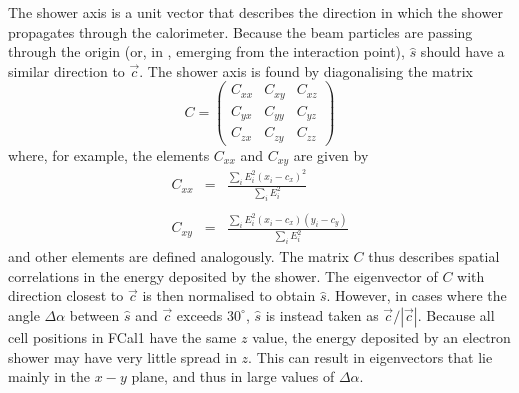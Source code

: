 The shower axis is a unit vector that describes the direction in which the shower propagates through the calorimeter. Because the beam particles are passing through the origin (or, in \atlas, emerging from the interaction point), $\hat{s}$ should have a similar direction to $\vec{c}$. The shower axis is found by diagonalising the matrix 
\begin{equation}
C = \left(
\begin{array}{ccc}
C_{xx} & C_{xy} & C_{xz}\\
C_{yx} & C_{yy} & C_{yz}\\
C_{zx} & C_{zy} & C_{zz}
\end{array}
\right)
\end{equation}
where, for example, the elements $C_{xx}$ and $C_{xy}$ are given by
\begin{eqnarray}
C_{xx}  & = & \frac{\sum_i E_i^2 (x_i -c_x)^2}{\sum_i E_i^2}\\ \nonumber \\
C_{xy} & = & \frac{\sum_i E_i^2 (x_i -c_x)(y_i - c_y)}{\sum_i E_i^2}
\end{eqnarray}
and other elements are defined analogously. The matrix $C$ thus describes spatial correlations in the energy deposited by the shower. The eigenvector of $C$ with direction closest to $\vec{c}$ is then normalised to obtain $\hat{s}$. However, in cases where the angle $\Delta \alpha$ between $\hat{s}$ and $\vec{c}$ exceeds $30^\circ$, $\hat{s}$ is instead taken as $\vec{c}/|\vec{c}|$. Because all cell positions in FCal1 have the same $z$ value, the energy deposited by an electron shower may have very little spread in $z$. This can result in eigenvectors that lie mainly in the $x-y$ plane, and thus in large values of $\Delta \alpha$.

%
%
%

